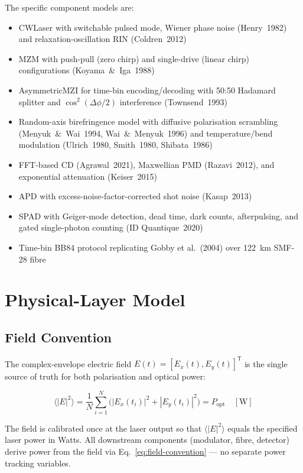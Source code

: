 \documentclass[11pt,a4paper]{article}
\begin{document}
The specific component models are:
\begin{itemize}[nosep]
  \item CWLaser with switchable pulsed mode, Wiener phase noise (Henry~1982)
    and relaxation-oscillation RIN (Coldren~2012)
  \item MZM with push-pull (zero chirp) and single-drive (linear chirp)
    configurations (Koyama~\&~Iga~1988)
  \item AsymmetricMZI for time-bin encoding/decoding with 50:50 Hadamard
    splitter and $\cos^2(\Delta\phi/2)$ interference (Townsend~1993)
  \item Random-axis birefringence model with diffusive polarisation
    scrambling (Menyuk~\&~Wai~1994, Wai~\&~Menyuk~1996) and
    temperature/bend modulation (Ulrich~1980, Smith~1980, Shibata~1986)
  \item FFT-based CD (Agrawal~2021), Maxwellian PMD (Razavi~2012), and
    exponential attenuation (Keiser~2015)
  \item APD with excess-noise-factor-corrected shot noise (Kasap~2013)
  \item SPAD with Geiger-mode detection, dead time, dark counts,
    afterpulsing, and gated single-photon counting (ID Quantique~2020)
  \item Time-bin BB84 protocol replicating Gobby et al.~(2004) over
    122~km SMF-28 fibre
\end{itemize}

\section{Physical-Layer Model}

\subsection{Field Convention}

The complex-envelope electric field $E(t) = [E_x(t), E_y(t)]^\mathsf{T}$ is
the single source of truth for both polarisation and optical power:

\begin{equation}
  \langle |E|^2 \rangle = \frac{1}{N}\sum_{i=1}^N
  \bigl(|E_x(t_i)|^2 + |E_y(t_i)|^2\bigr) = P_{\text{opt}} \quad [\text{W}]
  \label{eq:field-convention}
\end{equation}

The field is calibrated once at the laser output so that $\langle|E|^2\rangle$
equals the specified laser power in Watts.  All downstream components
(modulator, fibre, detector) derive power from the field via
Eq.~\ref{eq:field-convention} --- no separate power tracking variables.
\end{document}
